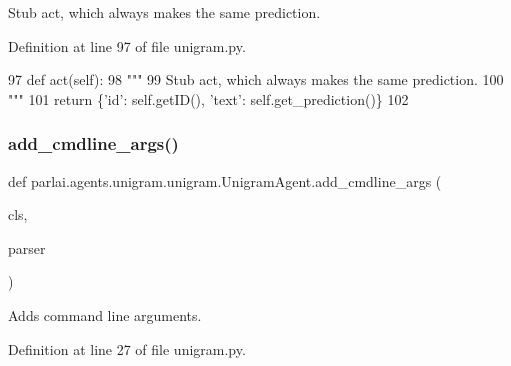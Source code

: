 \begin{DoxyVerb}Stub act, which always makes the same prediction.
\end{DoxyVerb}
 

Definition at line 97 of file unigram.\+py.


\begin{DoxyCode}
97     \textcolor{keyword}{def }act(self):
98         \textcolor{stringliteral}{"""}
99 \textcolor{stringliteral}{        Stub act, which always makes the same prediction.}
100 \textcolor{stringliteral}{        """}
101         \textcolor{keywordflow}{return} \{\textcolor{stringliteral}{'id'}: self.getID(), \textcolor{stringliteral}{'text'}: self.get\_prediction()\}
102 
\end{DoxyCode}
\mbox{\label{classparlai_1_1agents_1_1unigram_1_1unigram_1_1UnigramAgent_a975b292cb31540e198a220d3c9bd7ea5}} 
\subsubsection{\texorpdfstring{add\+\_\+cmdline\+\_\+args()}{add\_cmdline\_args()}}
{\footnotesize\ttfamily def parlai.\+agents.\+unigram.\+unigram.\+Unigram\+Agent.\+add\+\_\+cmdline\+\_\+args (\begin{DoxyParamCaption}\item[{}]{cls,  }\item[{}]{parser }\end{DoxyParamCaption})}

\begin{DoxyVerb}Adds command line arguments.
\end{DoxyVerb}
 

Definition at line 27 of file unigram.\+py.


